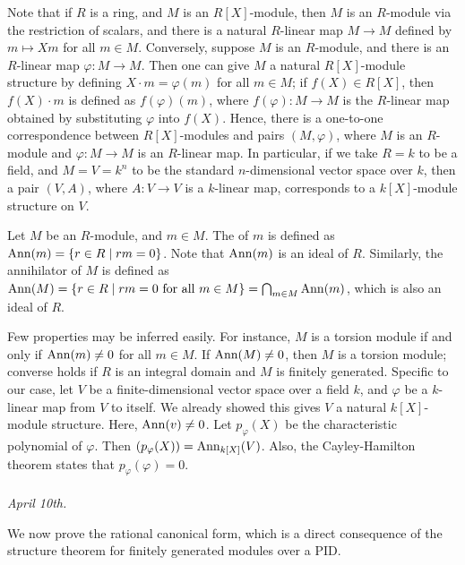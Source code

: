 Note that if $R$ is a ring, and $M$ is an $R[X]$-module, then $M$ is an $R$-module via the restriction of scalars, and there is a natural $R$-linear map $M \to M$ defined by $m \mapsto Xm$ for all $m \in M$. Conversely, suppose $M$ is an $R$-module, and there is an $R$-linear map $\varphi : M \to M$. Then one can give $M$ a natural $R[X]$-module structure by defining $X \cdot m = \varphi(m)$ for all $m \in M$; if $f(X) \in R[X]$, then $f(X) \cdot m$ is defined as $f(\varphi)(m)$, where $f(\varphi) : M \to M$ is the $R$-linear map obtained by substituting $\varphi$ into $f(X)$. Hence, there is a one-to-one correspondence between $R[X]$-modules and pairs $(M,\varphi)$, where $M$ is an $R$-module and $\varphi : M \to M$ is an $R$-linear map. In particular, if we take $R = k$ to be a field, and $M = V = k^{n}$ to be the standard $n$-dimensional vector space over $k$, then a pair $(V,A)$, where $A : V \to V$ is a $k$-linear map, corresponds to a $k[X]$-module structure on $V$.

\begin{definition}
    Let $M$ be an $R$-module, and $m \in M$. The  of $m$ is defined as $\operatorname{Ann}(m) = \{r \in R \mid rm = 0\}$. Note that $\operatorname{Ann}(m)$ is an ideal of $R$. Similarly, the annihilator of $M$ is defined as $\operatorname{Ann}(M) = \{r \in R \mid rm = 0 \text{ for all } m \in M\} = \bigcap_{m \in M} \operatorname{Ann}(m)$, which is also an ideal of $R$.
\end{definition}

Few properties may be inferred easily. For instance, $M$ is a torsion module if and only if $\operatorname{Ann}(m) \neq 0$ for all $m \in M$. If $\operatorname{Ann}(M) \neq 0$, then $M$ is a torsion module; converse holds if $R$ is an integral domain and $M$ is finitely generated. Specific to our case, let $V$ be a finite-dimensional vector space over a field $k$, and $\varphi$ be a $k$-linear map from $V$ to itself. We already showed this gives $V$ a natural $k[X]$-module structure. Here, $\operatorname{Ann}(v) \neq 0$. Let $p_{\varphi}(X)$ be the characteristic polynomial of $\varphi$. Then $(p_{\varphi}(X)) = \operatorname{Ann}_{k[X]}(V)$. Also, the Cayley-Hamilton theorem states that $p_{\varphi}(\varphi) = 0$.
\\ \\
\textit{April 10th.}

We now prove the rational canonical form, which is a direct consequence of the structure theorem for finitely generated modules over a PID.


